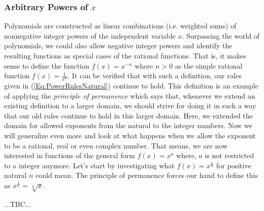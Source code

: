 


\subsubsection{Arbitrary Powers of $x$}
Polynomials are constructed as linear combinations (i.e. weighted sums) of nonnegative integer powers of the independent variable $x$. Surpassing the world of polynomials, we could also allow negative integer powers and identify the resulting functions as special cases of the rational functions. That is, it makes sense to define the function $f(x) = x^{-n}$ where $n > 0$ as the simple rational function $f(x) = \frac{1}{x^n}$. It can be verified that with such a definition, our rules given in (\ref{Eq:PowerRulesNatural}) continue to hold. This definition is an example of applying the \emph{principle of permanence} which says that, whenever we extend an existing definition to a larger domain, we should strive for doing it in such a way that our old rules continue to hold in this larger domain. Here, we extended the domain for allowed exponents from the natural to the integer numbers. Now we will generalize even more and look at what happens when we allow the exponent to be a rational, real or even complex number. That means, we are now interested in functions of the general form $f(x) = x^a$ where, $a$ is not restricted to a integer anymore. Let's start by investigating what $f(x) = x^{\frac{1}{n}}$ for positive natural $n$ could mean. The principle of permanence forces our hand to define this as $x^{\frac{1}{n}} = \sqrt[n]{x}$.

...TBC...



